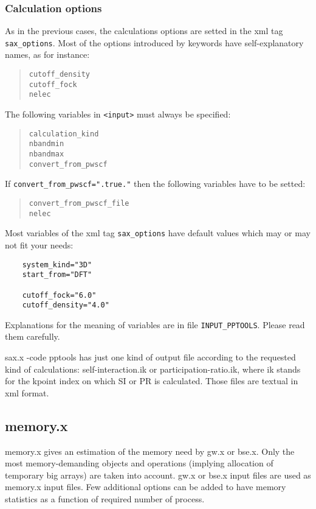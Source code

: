 \documentclass[11pt]{article}
\begin{document}
\subsubsection{Calculation options}
As in the previous cases, the calculations options are setted in the xml tag \texttt{sax\_options}.
Most of the options introduced by keywords have self-explanatory names, as for instance:
\begin{quote}
  \texttt{cutoff\_density}\\ 
  \texttt{cutoff\_fock}\\ 
  \texttt{nelec} 
\end{quote}

The following variables in \texttt{<input>} must always be
specified:
\begin{quote}
  \texttt{calculation\_kind}\\
  \texttt{nbandmin}\\
  \texttt{nbandmax}\\
  \texttt{convert\_from\_pwscf}\\
\end{quote}
If \texttt{convert\_from\_pwscf=".true."} then the following variables have to be setted:
\begin{quote}
  \texttt{convert\_from\_pwscf\_file}\\
  \texttt{nelec}\\
\end{quote}

Most variables of the xml tag \texttt{sax\_options} have default values which may or may not fit your needs:
\begin{verbatim}
    system_kind="3D"
    start_from="DFT"

    cutoff_fock="6.0"
    cutoff_density="4.0"
\end{verbatim}

Explanations for the meaning of variables are in file \texttt{INPUT\_PPTOOLS}. Please read them carefully.


sax.x -code pptools has just one kind of output file according to the requested kind of calculations: self-interaction.ik or participation-ratio.ik, where ik stands for the kpoint index on which SI or PR is calculated. Those files are textual in xml format.

\subsection{memory.x}
memory.x gives an estimation of the memory need by gw.x or bse.x. Only the most memory-demanding objects and operations (implying allocation of temporary big arrays) are taken into account. gw.x or bse.x input files are used as memory.x input files. Few additional options can be added to have memory statistics as a function of required number of process.
\end{document}

